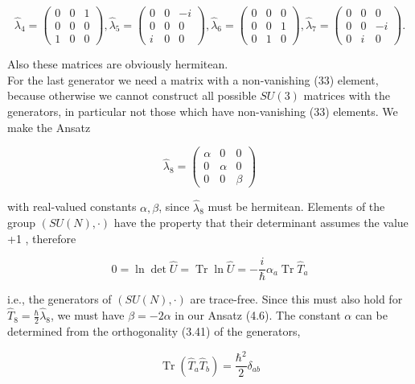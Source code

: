 \documentclass[10pt, letterpaper]{article}
\begin{document}
$$
\hat{\lambda}_{4}=\left(\begin{array}{lll}
0 & 0 & 1 \\
0 & 0 & 0 \\
1 & 0 & 0
\end{array}\right), \hat{\lambda}_{5}=\left(\begin{array}{ccc}
0 & 0 & -i \\
0 & 0 & 0 \\
i & 0 & 0
\end{array}\right), \hat{\lambda}_{6}=\left(\begin{array}{lll}
0 & 0 & 0 \\
0 & 0 & 1 \\
0 & 1 & 0
\end{array}\right), \hat{\lambda}_{7}=\left(\begin{array}{ccc}
0 & 0 & 0 \\
0 & 0 & -i \\
0 & i & 0
\end{array}\right) .
$$

Also these matrices are obviously hermitean.\\
For the last generator we need a matrix with a non-vanishing (33) element, because otherwise we cannot construct all possible $S U(3)$ matrices with the generators, in particular not those which have non-vanishing (33) elements. We make the Ansatz

$$
\hat{\lambda}_{8}=\left(\begin{array}{ccc}
\alpha & 0 & 0 \\
0 & \alpha & 0 \\
0 & 0 & \beta
\end{array}\right)
$$

with real-valued constants $\alpha, \beta$, since $\hat{\lambda}_{8}$ must be hermitean. Elements of the group $(S U(N), \cdot)$ have the property that their determinant assumes the value +1 , therefore

$$
0=\ln \operatorname{det} \hat{U}=\operatorname{Tr} \ln \hat{U}=-\frac{i}{\hbar} \alpha_{a} \operatorname{Tr} \hat{T}_{a}
$$

i.e., the generators of $(S U(N), \cdot)$ are trace-free. Since this must also hold for $\hat{T}_{8}=\frac{\hbar}{2} \hat{\lambda}_{8}$, we must have $\beta=-2 \alpha$ in our Ansatz (4.6). The constant $\alpha$ can be determined from the orthogonality (3.41) of the generators,

$$
\operatorname{Tr}\left(\hat{T}_{a} \hat{T}_{b}\right)=\frac{\hbar^{2}}{2} \delta_{a b}
$$
\end{document}
